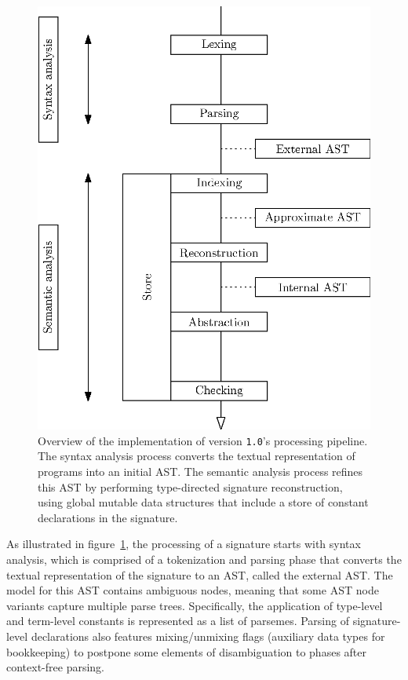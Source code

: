 \begin{figure}
\centering
\includegraphics{figures/legacy-beluga-processing-pipeline.eps}
\caption[Overview of the implementation of \Beluga version \texttt{1.0}'s processing pipeline]{%
Overview of the implementation of \Beluga version \texttt{1.0}'s processing pipeline.
The syntax analysis process converts the textual representation of \Beluga programs into an initial \acs{AST}.
The semantic analysis process refines this \acs{AST} by performing type-directed signature reconstruction, using global mutable data structures that include a store of constant declarations in the signature.
}
\label{figure:legacy-beluga-processing-pipeline}
\end{figure}

As illustrated in figure~\ref{figure:legacy-beluga-processing-pipeline}, the processing of a \Beluga signature starts with syntax analysis, which is comprised of a tokenization and parsing phase that converts the textual representation of the signature to an \ac{AST}, called the external \ac{AST}.
The model for this \ac{AST} contains ambiguous nodes, meaning that some \ac{AST} node variants capture multiple parse trees.
Specifically, the application of \LF type-level and term-level constants is represented as a list of parsemes.
Parsing of signature-level declarations also features mixing/unmixing flags (auxiliary data types for bookkeeping) to postpone some elements of disambiguation to phases after context-free parsing.

